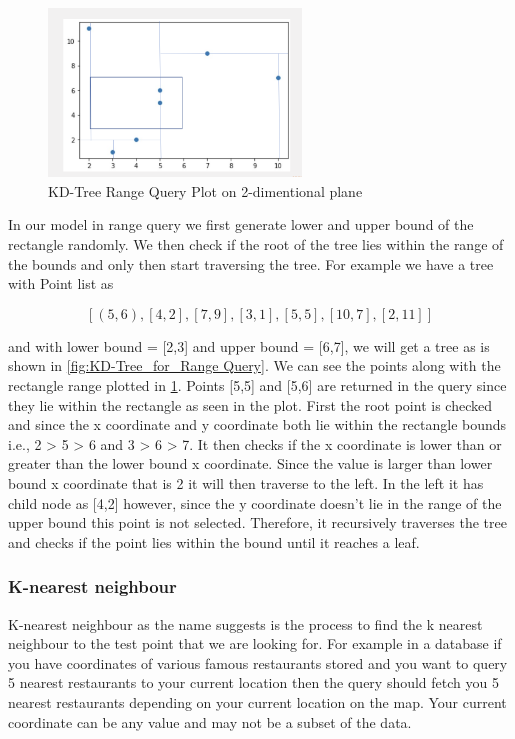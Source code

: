 \begin{figure}[htp]
    \centering
    \includegraphics[width=0.6\textwidth]{graphs/Range_Query_plot.png}
    \caption{KD-Tree Range Query Plot on 2-dimentional plane}
    \label{fig:KD_Tree_Range_Query_Plot}
\end{figure}

In our model in range query we first generate lower and upper bound of the rectangle randomly. We then check if the root of the tree lies within the range of the bounds and only then start traversing the tree. For example we have a tree with Point list as 

	$$[(5,6),[4,2],[7,9],[3,1],[5,5],[10,7],[2,11]]$$
	
	and with lower bound = [2,3] and upper bound = [6,7], we will get a tree as is shown in \ref{fig:KD-Tree_for_Range Query}. We can see the points along with the rectangle range plotted in \ref{fig:KD_Tree_Range_Query_Plot}. Points [5,5] and [5,6] are returned in the query since they lie within the rectangle as seen in the plot. First the root point is checked and since the x coordinate and y coordinate both lie within the rectangle bounds i.e., 2 > 5 > 6 and 3 > 6 > 7. It then checks if the x coordinate is lower than or greater than the lower bound x coordinate. Since the value is larger than lower bound x coordinate that is 2 it will then traverse to the left. In the left it has child node as [4,2] however, since the y coordinate doesn't lie in the range of the upper bound this point is not selected. Therefore, it recursively traverses the tree and checks if the point lies within the bound until it reaches a leaf.

\subsubsection{K-nearest neighbour}

K-nearest neighbour as the name suggests is the process to find the k nearest neighbour to the test point that we are looking for. For example in a database if you have coordinates of various famous restaurants stored and you want to query 5 nearest restaurants to your current location then the query should fetch you 5 nearest restaurants depending on your current location on the map. Your current coordinate can be any value and may not be a subset of the data. \\

